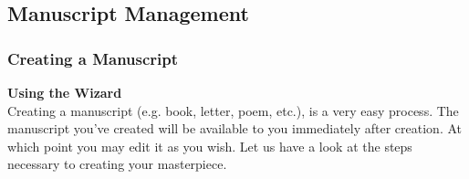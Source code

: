 \subsection{Manuscript Management}
\subsubsection{Creating a Manuscript}
\textbf{Using the Wizard}\\
	Creating a manuscript (e.g. book, letter, poem, etc.), is a very easy process. The manuscript you've created will be available to you immediately after creation. At which point you may edit it as you wish. Let us have a look at the steps necessary to creating your masterpiece.\\ \\


